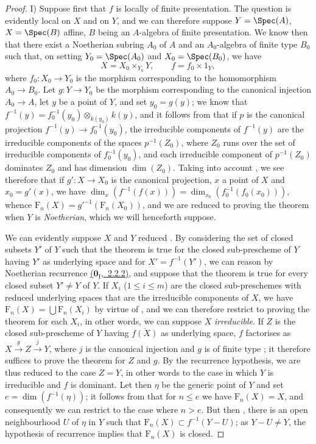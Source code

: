 \begin{proof}
I) Suppose first that $f$ is locally of finite presentation.
The question is evidently local on $X$ and on $Y$, and we can therefore suppose $Y=\Spec(A)$, $X=\Spec(B)$ affine, $B$ being an $A$-algebra of finite presentation.
We know then  that there exist a Noetherian subring $A_0$ of $A$ and an $A_0$-algebra of finite type $B_0$ such that, on setting $Y_0=\Spec(A_0)$ and $X_0=\Spec(B_0)$, we have
\[
X=X_0\times_{Y_0}Y,\qquad f=f_0\times 1_Y,
\]
where $f_0:X_0\to Y_0$ is the morphism corresponding to the homomorphism $A_0\to B_0$.
Let $g:Y\to Y_0$ be the morphism corresponding to the canonical injection $A_0\to A$, let $y$ be a point of $Y$, and set $y_0=g(y)$; we know that $f^{-1}(y)=f_0^{-1}(y_0)\otimes_{k(y_0)}k(y)$, and it follows from  that if $p$ is the canonical projection $f^{-1}(y)\to f_0^{-1}(y_0)$, the irreducible components of $f^{-1}(y)$ are the irreducible components of the spaces $p^{-1}(Z_0)$, where $Z_0$ runs over the set of irreducible components of $f_0^{-1}(y_0)$, and each irreducible component of $p^{-1}(Z_0)$ dominates $Z_0$ and has dimension $\dim(Z_0)$.
Taking into account , we see therefore that if $g':X\to X_0$ is the canonical projection, $x$ a point of $X$ and $x_0=g'(x)$, we have $\dim_x(f^{-1}(f(x)))=\dim_{x_0}(f_0^{-1}(f_0(x_0)))$, whence $\mathrm{F}_n(X)={g'}^{-1}(\mathrm{F}_n(X_0))$, and we are reduced to proving the theorem when $Y$ is \emph{Noetherian}, which we will henceforth suppose.

We can evidently suppose $X$ and $Y$ reduced .
By considering the set of closed subsets $Y'$ of $Y$ such that the theorem is true for the closed sub-prescheme of $Y$ having $Y'$ as underlying space and for $X'=f^{-1}(Y')$, we can reason by Noetherian recurrence \hyperref[0.2.2.2]{($\mathbf{0}_{\mathrm{I}}$,~2.2.2)}, and suppose that the theorem is true for every closed subset $Y'\neq Y$ of $Y$.
If $X_i$ ($1\leq i\leq m$) are the closed sub-preschemes with reduced underlying spaces that are the irreducible components of $X$, we have $\mathrm{F}_n(X)=\bigcup\mathrm{F}_n(X_i)$ by virtue of , and we can therefore restrict to proving the theorem for each $X_i$, in other words, we can suppose $X$ \emph{irreducible}.
If $Z$ is the closed sub-prescheme of $Y$ having $\overline{f(X)}$ as underlying space, $f$ factorises as $X\xrightarrow{g}Z\xrightarrow{j}Y$, where $j$ is the canonical injection  and $g$ is of finite type ; it therefore suffices to prove the theorem for $Z$ and $g$. By the recurrence hypothesis, we are thus reduced to the case $Z=Y$, in other words to the case in which $Y$ is irreducible and $f$ is dominant.
Let then $\eta$ be the generic point of $Y$ and set $e=\dim(f^{-1}(\eta))$; it follows from  that for $n\leq e$ we have $\mathrm{F}_n(X)=X$, and consequently we can restrict to the case where $n>e$.
But then , there is an open neighbourhood $U$ of $\eta$ in $Y$ such that $\mathrm{F}_n(X)\subset f^{-1}(Y-U)$; as $Y-U\neq Y$, the hypothesis of recurrence implies that $\mathrm{F}_n(X)$ is closed.


\end{proof}
